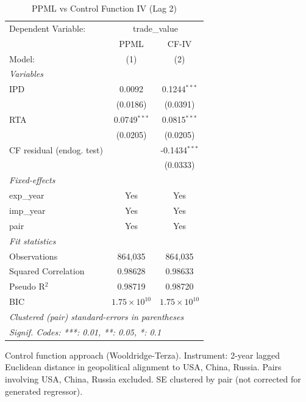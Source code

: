 
\begin{table}[htbp]
   \caption{PPML vs Control Function IV (Lag 2)}
   \centering
   \begin{tabular}{lcc}
      \tabularnewline \midrule \midrule
      Dependent Variable: & \multicolumn{2}{c}{trade\_value}\\
                                & PPML                  & CF-IV \\   
      Model:                    & (1)                   & (2)\\  
      \midrule
      \emph{Variables}\\
      IPD                       & 0.0092                & 0.1244$^{***}$\\   
                                & (0.0186)              & (0.0391)\\   
      RTA                       & 0.0749$^{***}$        & 0.0815$^{***}$\\   
                                & (0.0205)              & (0.0205)\\   
      CF residual (endog. test) &                       & -0.1434$^{***}$\\   
                                &                       & (0.0333)\\   
      \midrule
      \emph{Fixed-effects}\\
      exp\_year                 & Yes                   & Yes\\  
      imp\_year                 & Yes                   & Yes\\  
      pair                      & Yes                   & Yes\\  
      \midrule
      \emph{Fit statistics}\\
      Observations              & 864,035               & 864,035\\  
      Squared Correlation       & 0.98628               & 0.98633\\  
      Pseudo R$^2$              & 0.98719               & 0.98720\\  
      BIC                       & $1.75\times 10^{10}$  & $1.75\times 10^{10}$\\   
      \midrule \midrule
      \multicolumn{3}{l}{\emph{Clustered (pair) standard-errors in parentheses}}\\
      \multicolumn{3}{l}{\emph{Signif. Codes: ***: 0.01, **: 0.05, *: 0.1}}\\
   \end{tabular}
   
   \par \raggedright 
   Control function approach (Wooldridge-Terza). Instrument: 2-year lagged Euclidean distance in geopolitical alignment to USA, China, Russia. Pairs involving USA, China, Russia excluded. SE clustered by pair (not corrected for generated regressor).
\end{table}



